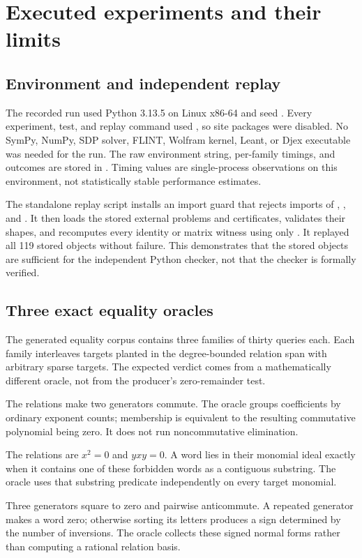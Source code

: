 \section{Executed experiments and their limits}
\label{sec:evidence}

\subsection{Environment and independent replay}

The recorded run used Python 3.13.5 on Linux x86-64 and seed
. Every experiment, test, and replay command used
, so site packages were disabled. No SymPy, NumPy, SDP solver,
FLINT, Wolfram kernel, Leant, or Djex executable was needed for the run.
The raw environment string, per-family timings, and outcomes are stored in
. Timing values are single-process observations
on this environment, not statistically stable performance estimates.

The standalone replay script installs an import guard that rejects imports of
, , and .
It then loads the stored external problems and certificates, validates their
shapes, and recomputes every identity or matrix witness using only
. It replayed all 119 stored objects without failure.
This demonstrates that the stored objects are sufficient for the independent
Python checker, not that the checker is formally verified.

\subsection{Three exact equality oracles}

The generated equality corpus contains three families of thirty queries each.
Each family interleaves targets planted in the degree-bounded relation span with
arbitrary sparse targets. The expected verdict comes from a mathematically
different oracle, not from the producer's zero-remainder test.

\begin{description}[style=nextline,leftmargin=0pt,labelwidth=0pt,labelsep=0pt]
\item[Commuting generators.]
The relations make two generators commute. The oracle groups coefficients by
ordinary exponent counts; membership is equivalent to the resulting commutative
polynomial being zero. It does not run noncommutative elimination.
\item[Monomial relations.]
The relations are $x^2=0$ and $yxy=0$. A word lies in their monomial ideal exactly
when it contains one of these forbidden words as a contiguous substring. The
oracle uses that substring predicate independently on every target monomial.
\item[Exterior relations.]
Three generators square to zero and pairwise anticommute. A repeated generator
makes a word zero; otherwise sorting its letters produces a sign determined by
the number of inversions. The oracle collects these signed normal forms rather
than computing a rational relation basis.
\end{description}

